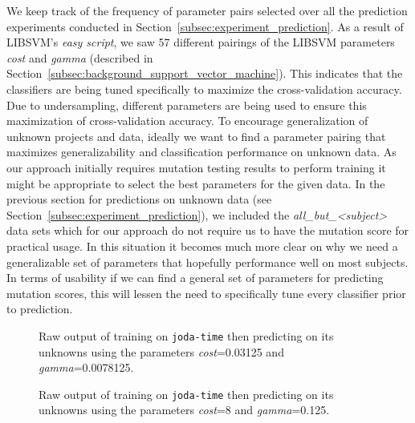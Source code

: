 \noindent
We keep track of the frequency of parameter pairs selected over all the prediction experiments conducted in Section~\ref{subsec:experiment_prediction}. As a result of LIBSVM's \emph{easy script}, we saw 57 different pairings of the LIBSVM parameters \emph{cost} and \emph{gamma} (described in Section~\ref{subsec:background_support_vector_machine}). This indicates that the classifiers are being tuned specifically to maximize the cross-validation accuracy. Due to undersampling, different parameters are being used to ensure this maximization of cross-validation accuracy. To encourage generalization of unknown projects and data, ideally we want to find a parameter pairing that maximizes generalizability and classification performance on unknown data. As our approach initially requires mutation testing results to perform training it might be appropriate to select the best parameters for the given data. In the previous section for predictions on unknown data (see Section~\ref{subsec:experiment_prediction}), we included the \emph{all\_but\_<subject>} data sets which for our approach do not require us to have the mutation score for practical usage. In this situation it becomes much more clear on why we need a generalizable set of parameters that hopefully performance well on most subjects. In terms of usability if we can find a general set of parameters for predicting mutation scores, this will lessen the need to specifically tune every classifier prior to prediction.

\begin{sidewaysfigure}[!tb]
  \centering
  \caption{Raw output of training on \texttt{joda-time} then predicting on its unknowns using the parameters \emph{cost}=0.03125 and \emph{gamma}=0.0078125.}
  \label{fig:raw_output_bad}
  \begin{minipage}{22.0cm}
  \scriptsize{
  
  }
  \end{minipage}
  
	\vspace{3em}

  \centering
  \caption{Raw output of training on \texttt{joda-time} then predicting on its unknowns using the parameters \emph{cost}=8 and \emph{gamma}=0.125.}
  \label{fig:raw_output_good}
  \begin{minipage}{22.0cm}
  \scriptsize{
  
  }
  \end{minipage}
\end{sidewaysfigure}
\afterpage\clearpage

